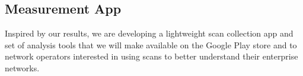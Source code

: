 \begin{comment}
  \subsection{Device Heterogeneity}
  \label{subsec:heterogeneity}

  In the \ubscan{} dataset that is mostly analyzed throughout this paper, all scan
  results are collected from devices of the same model (Nexus 5). We now reflect
  on whether this hardware homogeneity is necessary, and what the impact of device
  heterogeneity would be on each of the case studies.

  \wifi{} chipsets and drivers from various manufacturers may have different
  policies on the scanning rate. Yet, as we showed earlier in
  Section~\ref{sec:scan}, most wireless devices from different vendors perform
  \wifi{} scans quite aggressively. Therefore, the device heterogeneity shall
  have negligible impact on the temporal resolution of the measurements.

  On other hand, \wifi{} chipsets do have various RF characteristics, such as
  carrier sensing range or antenna sensitivity. For instance, when building
  client-perceived conflict graph (\S\ref{subsec:channel}), a more sensitive
  device may reveal more conflict edges than a less sensitive one. And
  similarly, devices with different sensitivity levels may disagree on the
  offending set of the same RAP (\S\ref{subsec:rogue}).

  To tolerate such diversity, the measurement post-processing logic can either
  be aggressive by adopting the superset of observations from different
  devices, or be conservative and only consider common conflicts reported by
  most devices. Additionally, note that relative ordering of the APs by
  signal strength is usually consistent for each device, therefore the device
  heterogeneity has minimal impact on the spatial planning case study, where
  only the relative ordering of the APs instead of the absolute RSSI values is
  utilized.

\end{comment}

\subsection{Measurement App}

Inspired by our results, we are developing a lightweight scan collection app
and set of analysis tools that we will make available on the Google Play
store and to network operators interested in using scans to better
understand their enterprise \wifi{} networks.
